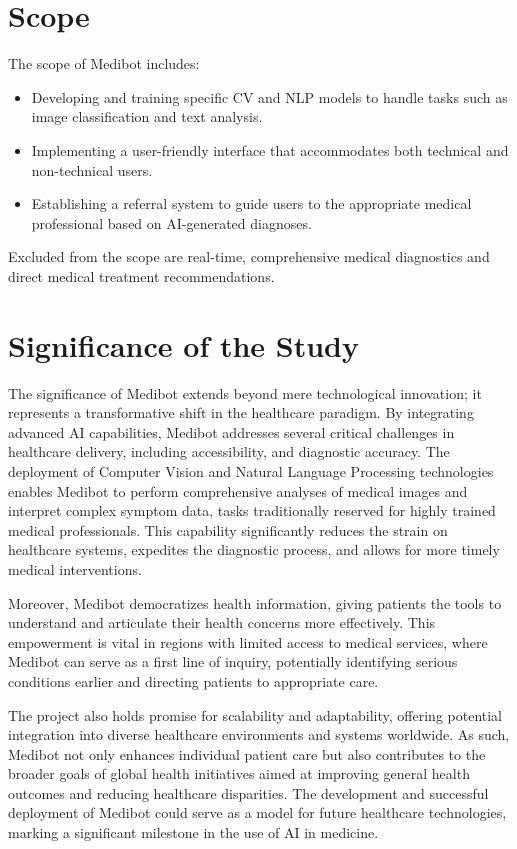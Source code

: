 \section{Scope}
The scope of Medibot includes:
\begin{itemize}
    \item Developing and training specific CV and NLP models to handle tasks such as image classification and text analysis.
    \item Implementing a user-friendly interface that accommodates both technical and non-technical users.
    \item Establishing a referral system to guide users to the appropriate medical professional based on AI-generated diagnoses.
\end{itemize}
Excluded from the scope are real-time, comprehensive medical diagnostics and direct medical treatment recommendations.

\section{Significance of the Study}
The significance of Medibot extends beyond mere technological innovation; it represents a transformative shift in the healthcare paradigm. By integrating advanced AI capabilities, Medibot addresses several critical challenges in healthcare delivery, including accessibility, and diagnostic accuracy. The deployment of Computer Vision and Natural Language Processing technologies enables Medibot to perform comprehensive analyses of medical images and interpret complex symptom data, tasks traditionally reserved for highly trained medical professionals. This capability significantly reduces the strain on healthcare systems, expedites the diagnostic process, and allows for more timely medical interventions.

Moreover, Medibot democratizes health information, giving patients the tools to understand and articulate their health concerns more effectively. This empowerment is vital in regions with limited access to medical services, where Medibot can serve as a first line of inquiry, potentially identifying serious conditions earlier and directing patients to appropriate care.

The project also holds promise for scalability and adaptability, offering potential integration into diverse healthcare environments and systems worldwide. As such, Medibot not only enhances individual patient care but also contributes to the broader goals of global health initiatives aimed at improving general health outcomes and reducing healthcare disparities. The development and successful deployment of Medibot could serve as a model for future healthcare technologies, marking a significant milestone in the use of AI in medicine.


